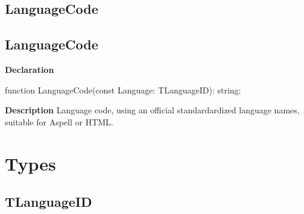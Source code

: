 \documentclass{report}
\newif\ifpdf
\begin{document}
\subsection*{\large{\textbf{LanguageCode}}\normalsize\hspace{1ex}\hrulefill}
\else
\subsection*{LanguageCode}
\fi
\label{PasDoc_Languages-LanguageCode}
\begin{list}{}{
\setlength{\itemindent}{0cm}
\setlength{\listparindent}{0cm}
\setlength{\leftmargin}{\evensidemargin}
\addtolength{\leftmargin}{\tmplength}
\settowidth{\labelsep}{X}
\addtolength{\leftmargin}{\labelsep}
\setlength{\labelwidth}{\tmplength}
}
\item[\textbf{Declaration}\hfill]
\ifpdf
\begin{flushleft}
\fi
\begin{ttfamily}
function LanguageCode(const Language: TLanguageID): string;\end{ttfamily}

\ifpdf
\end{flushleft}
\fi

\par
\item[\textbf{Description}]
Language code, using an official standardardized language names, suitable for Aspell or HTML.

\end{list}
\section{Types}
\ifpdf
\subsection*{\large{\textbf{TLanguageID}}\normalsize\hspace{1ex}\hrulefill}
\else
\end{document}
